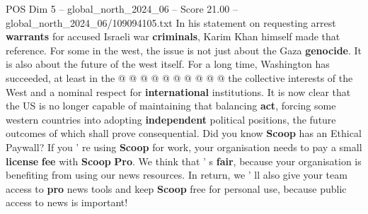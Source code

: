 \begin{textsample}{POS Dim 5 – global\_north\_2024\_06 – Score 21.00 – global\_north\_2024\_06/109094105.txt}
In his statement on requesting arrest \textbf{warrants} for accused Israeli war \textbf{criminals}, Karim Khan himself made that reference.
For some in the west, the issue is not just about the Gaza \textbf{genocide}.
It is also about the future of the west itself.
For a long time, Washington has succeeded, at least in the @ @ @ @ @ @ @ @ @ @ the collective interests of the West and a nominal respect for \textbf{international} institutions.
It is now clear that the US is no longer capable of maintaining that balancing \textbf{act}, forcing some western countries into adopting \textbf{independent} political positions, the future outcomes of which shall prove consequential.
Did you know \textbf{Scoop} has an Ethical Paywall?
If you ' re using \textbf{Scoop} for work, your organisation needs to pay a small \textbf{license} \textbf{fee} with \textbf{Scoop} \textbf{Pro}.
We think that ' s \textbf{fair}, because your organisation is benefiting from using our news resources.
In return, we ' ll also give your team access to \textbf{pro} news tools and keep \textbf{Scoop} free for personal use, because public access to news is important!

\end{textsample}
